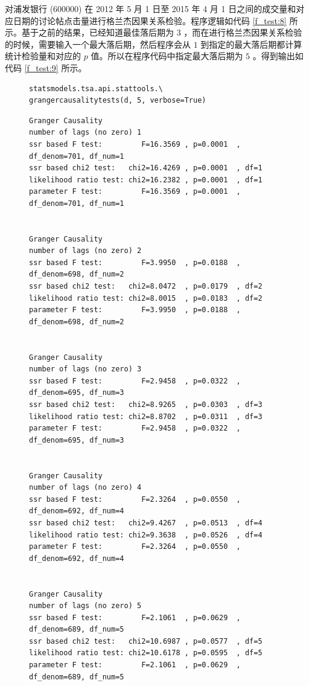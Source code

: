 对浦发银行 (600000) 在 2012 年 5 月 1 日至 2015 年 4 月 1 日之间的成交量和对应日期的讨论帖点击量进行格兰杰因果关系检验。程序逻辑如代码 \ref{f_test:8} 所示。基于之前的结果，已经知道最佳落后期为 $3$ ，而在进行格兰杰因果关系检验的时候，需要输入一个最大落后期，然后程序会从 $1$ 到指定的最大落后期都计算统计检验量和对应的 $p$ 值。所以在程序代码中指定最大落后期为 $5$ 。得到输出如代码 \ref{f_test:9} 所示。

\begin{figure}
  \begin{minipage}{\textwidth}
    \begin{lstlisting}[caption=浦发银行 (600000) 格兰杰因果关系检验, label=f_test:8]
statsmodels.tsa.api.stattools.\
grangercausalitytests(d, 5, verbose=True)
    \end{lstlisting}
  \end{minipage}
\end{figure}

\begin{figure}
  \begin{minipage}{\textwidth}
    \begin{lstlisting}[caption=浦发银行 (600000) 检验结果, label=f_test:9]
Granger Causality
number of lags (no zero) 1
ssr based F test:         F=16.3569 , p=0.0001  , df_denom=701, df_num=1
ssr based chi2 test:   chi2=16.4269 , p=0.0001  , df=1
likelihood ratio test: chi2=16.2382 , p=0.0001  , df=1
parameter F test:         F=16.3569 , p=0.0001  , df_denom=701, df_num=1


Granger Causality
number of lags (no zero) 2
ssr based F test:         F=3.9950  , p=0.0188  , df_denom=698, df_num=2
ssr based chi2 test:   chi2=8.0472  , p=0.0179  , df=2
likelihood ratio test: chi2=8.0015  , p=0.0183  , df=2
parameter F test:         F=3.9950  , p=0.0188  , df_denom=698, df_num=2


Granger Causality
number of lags (no zero) 3
ssr based F test:         F=2.9458  , p=0.0322  , df_denom=695, df_num=3
ssr based chi2 test:   chi2=8.9265  , p=0.0303  , df=3
likelihood ratio test: chi2=8.8702  , p=0.0311  , df=3
parameter F test:         F=2.9458  , p=0.0322  , df_denom=695, df_num=3


Granger Causality
number of lags (no zero) 4
ssr based F test:         F=2.3264  , p=0.0550  , df_denom=692, df_num=4
ssr based chi2 test:   chi2=9.4267  , p=0.0513  , df=4
likelihood ratio test: chi2=9.3638  , p=0.0526  , df=4
parameter F test:         F=2.3264  , p=0.0550  , df_denom=692, df_num=4


Granger Causality
number of lags (no zero) 5
ssr based F test:         F=2.1061  , p=0.0629  , df_denom=689, df_num=5
ssr based chi2 test:   chi2=10.6987 , p=0.0577  , df=5
likelihood ratio test: chi2=10.6178 , p=0.0595  , df=5
parameter F test:         F=2.1061  , p=0.0629  , df_denom=689, df_num=5
    \end{lstlisting}
  \end{minipage}
\end{figure}


